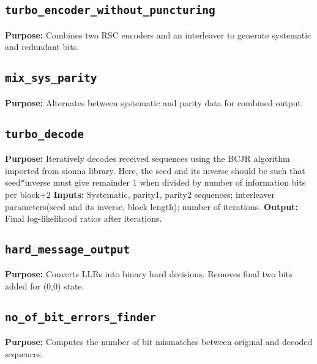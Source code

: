 \documentclass[12pt]{article}
\begin{document}
\subsection*{\texttt{turbo\_encoder\_without\_puncturing}}
\textbf{Purpose:} Combines two RSC encoders and an interleaver to generate systematic and redundant bits.

\subsection*{\texttt{mix\_sys\_parity}}
\textbf{Purpose:} Alternates between systematic and parity data for combined output.

\subsection*{\texttt{turbo\_decode}}
\textbf{Purpose:} Iteratively decodes received sequences using the BCJR algorithm imported from sionna library. Here, the seed and its inverse should be such that seed*inverse must give remainder 1 when divided by number of information bits per block+2 \newline
\textbf{Inputs:} Systematic, parity1, parity2 sequences; interleaver parameters(seed and its inverse, block length); number of iterations.\newline
\textbf{Output:} Final log-likelihood ratios after iterations.

\subsection*{\texttt{hard\_message\_output}}
\textbf{Purpose:} Converts LLRs into binary hard decisions. Removes final two bits added for (0,0) state.

\subsection*{\texttt{no\_of\_bit\_errors\_finder}}
\textbf{Purpose:} Computes the number of bit mismatches between original and decoded sequences.
\end{document}
